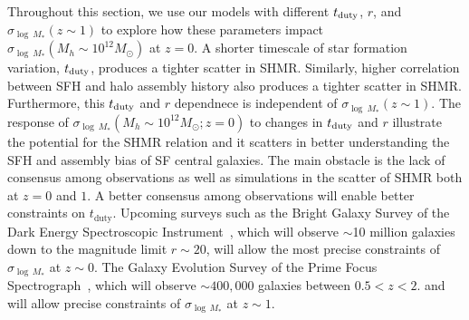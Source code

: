\documentclass[12pt, letterpaper, preprint, tighten]{aastex62}
\newcommand{\edt}[1]{{\color{dred}{\bf} #1}}
\newcommand{\tduty}{t_{\rm duty}}
\newcommand{\logsfr}{\log\mathrm{SFR}}
\begin{document}
\edt{
    Throughout this section, we use our models with different $\tduty$, $r$, and
$\sigma_{\log~M_*}(z\sim1)$ to explore how these parameters impact
$\sigma_{\log~M_*}(M_h\sim10^{12}M_\odot)$ at $z=0$. A shorter timescale of
star formation variation, $\tduty$, produces a tighter scatter in SHMR. Similarly,
higher correlation between SFH and halo assembly history also produces a tighter
scatter in SHMR. Furthermore, this $\tduty$ and $r$ dependnece is independent of
$\sigma_{\log~M_*}(z\sim1)$. The response of $\sigma_{\log~M_*}(M_h\sim10^{12}M_\odot; z=0)$
to changes in $\tduty$ and $r$ illustrate the potential for the SHMR relation
and it scatters in better understanding the SFH and assembly bias of SF central
galaxies. The main obstacle is the lack of consensus among observations as well
as simulations in the scatter of SHMR both at $z=0$ and $1$.
A better consensus among observations will enable better constraints
on $t_\mathrm{duty}$. Upcoming surveys such as the Bright Galaxy Survey of the Dark
Energy Spectroscopic Instrument~\citep[DESI;][]{desicollaboration2016}, which will
observe $\sim$10 million galaxies down to the magnitude limit $r \sim 20$, will
allow the most precise constraints of $\sigma_{\log\,M_*}$ at $z\sim0$. The Galaxy
Evolution Survey of the Prime Focus Spectrograph~\citep[PFS;][]{tamura2016}, which
will observe $\sim400,000$ galaxies between $0.5 < z < 2.$ and will allow
precise constraints of $\sigma_{\log\,M_*}$ at $z\sim1$.
}
\end{document}
